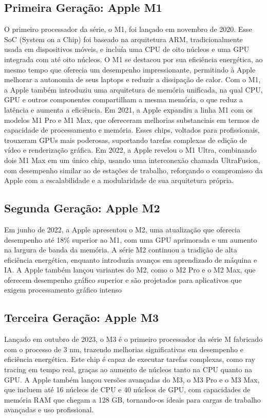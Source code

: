\documentclass[a4paper,times,12pt]{article}
\begin{document}
\subsection{Primeira Geração: Apple M1}
\hspace{+15pt} 
O primeiro processador da série, o M1, foi lançado em novembro de 2020. Esse SoC (System on a Chip) foi baseado na arquitetura ARM, tradicionalmente usada em dispositivos móveis, e incluía uma CPU de oito núcleos e uma GPU integrada com até oito núcleos. O M1 se destacou por sua eficiência energética, ao mesmo tempo que oferecia um desempenho impressionante, permitindo à Apple melhorar a autonomia de seus laptops e reduzir a dissipação de calor. Com o M1, a Apple também introduziu uma arquitetura de memória unificada, na qual CPU, GPU e outros componentes compartilham a mesma memória, o que reduz a latência e aumenta a eficiência.
Em 2021, a Apple expandiu a linha M1 com os modelos M1 Pro e M1 Max, que ofereceram melhorias substanciais em termos de capacidade de processamento e memória. Esses chips, voltados para profissionais, trouxeram GPUs mais poderosas, suportando tarefas complexas de edição de vídeo e renderização gráfica. Em 2022, a Apple revelou o M1 Ultra, combinando dois M1 Max em um único chip, usando uma interconexão chamada UltraFusion, com desempenho similar ao de estações de trabalho, reforçando o compromisso da Apple com a escalabilidade e a modularidade de sua arquitetura própria.

\subsection{Segunda Geração: Apple M2}
\hspace{+15pt} 
Em junho de 2022, a Apple apresentou o M2, uma atualização que oferecia desempenho até 18\% superior ao M1, com uma GPU aprimorada e um aumento na largura de banda da memória. A série M2 continuou a tradição de alta eficiência energética, enquanto introduzia avanços em aprendizado de máquina e IA. A Apple também lançou variantes do M2, como o M2 Pro e o M2 Max, que oferecem desempenho gráfico superior e são projetados para aplicativos que exigem processamento gráfico intenso
\subsection{Terceira Geração: Apple M3}
\hspace{+15pt}
Lançado em outubro de 2023, o M3 é o primeiro processador da série M fabricado com o processo de 3 nm, trazendo melhorias significativas em desempenho e eficiência energética. Este chip é capaz de executar tarefas complexas, como ray tracing em tempo real, graças ao aumento de núcleos tanto na CPU quanto na GPU. A Apple também lançou versões avançadas do M3, o M3 Pro e o M3 Max, que incluem até 16 núcleos de CPU e 40 núcleos de GPU, com capacidades de memória RAM que chegam a 128 GB, tornando-os ideais para cargas de trabalho avançadas e uso profissional.
\end{document}
